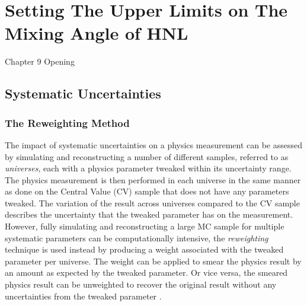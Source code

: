 \chapter{Setting The Upper Limits on The Mixing Angle of HNL}
\label{ChapterResult}

\ifpdf
    \graphicspath{{Chapter10/Figs/Raster/}{Chapter10/Figs/PDF/}{Chapter10/Figs/}}
\else
    \graphicspath{{Chapter10/Figs/Vector/}{Chapter10/Figs/}}
\fi


Chapter 9 Opening

\clearpage

\section{Systematic Uncertainties}

\subsection{The Reweighting Method}
\label{sec:reweighting}

The impact of systematic uncertainties on a physics measurement can be assessed by simulating and reconstructing a number of different samples, referred to as \textit{universes}, each with a physics parameter tweaked within its uncertainty range.
The physics measurement is then performed in each universe in the same manner as done on the Central Value (CV) sample that does not have any parameters tweaked.
The variation of the result across universes compared to the CV sample describes the uncertainty that the tweaked parameter has on the measurement.
However, fully simulating and reconstructing a large MC sample for multiple systematic parameters can be computationally intensive, the \textit{reweighting} technique is used instead by producing a weight associated with the tweaked parameter per universe.
The weight can be applied to smear the physics result by an amount as expected by the tweaked parameter.
Or vice versa, the smeared physics result can be unweighted to recover the original result without any uncertainties from the tweaked parameter \cite{cowan_stat}.

